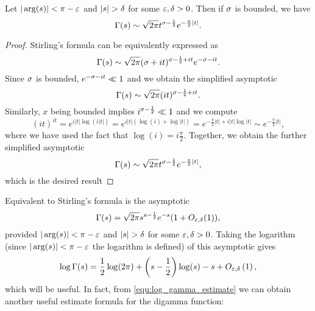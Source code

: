     \begin{corollary}\label{equ:weaker_Stirling_formula}
    Let $|\arg(s)| < \pi-\varepsilon$ and $|s| > \delta$ for some $\varepsilon,\delta > 0$. Then if $\sigma$ is bounded, we have
      \[
        \Gamma(s) \sim \sqrt{2\pi}t^{\sigma-\frac{1}{2}}e^{-\frac{\pi}{2}|t|}.
      \]
    \end{corollary}
    \begin{proof}
      Stirling's formula can be equivalently expressed as
      \[
        \Gamma(s) \sim \sqrt{2\pi}(\sigma+it)^{\sigma-\frac{1}{2}+it}e^{-\sigma-it}.
      \]
      Since $\sigma$ is bounded, $e^{-\sigma-it} \ll 1$ and we obtain the simplified asymptotic
      \[
        \Gamma(s) \sim \sqrt{2\pi}(it)^{\sigma-\frac{1}{2}+it}.
      \]
      Similarly, $x$ being bounded implies $i^{\sigma-\frac{1}{2}} \ll 1$ and we compute
      \[
        (it)^{it} = e^{i|t|\log(i|t|)} = e^{i|t|(\log(i)+\log|t|)} = e^{-\frac{\pi}{2}|t|+i|t|\log|t|} \sim e^{-\frac{\pi}{2}|t|},
      \]
      where we have used the fact that $\log(i) = i\frac{\pi}{2}$. Together, we obtain the further simplified asymptotic
      \[
        \Gamma(s) \sim \sqrt{2\pi}t^{\sigma-\frac{1}{2}}e^{-\frac{\pi}{2}|t|},
      \]
      which is the desired result
    \end{proof}
    Equivalent to Stirling's formula is the asymptotic
    \begin{equation}\label{equ:Stirlings_formula_equivalent_version}
        \Gamma(s) = \sqrt{2\pi}s^{s-\frac{1}{2}}e^{-s}(1+O_{\varepsilon,\delta}(1)),
    \end{equation}
    provided $|\arg(s)| < \pi-\varepsilon$ and $|s| > \delta$ for some $\varepsilon,\delta > 0$. Taking the logarithm (since $|\arg(s)| < \pi-\varepsilon$ the logarithm is defined) of this asymptotic gives
    \begin{equation}\label{equ:log_gamma_estimate}
      \log\Gamma(s) = \frac{1}{2}\log(2\pi)+\left(s-\frac{1}{2}\right)\log(s)-s+O_{\varepsilon,\delta}\left(1\right),
    \end{equation}
    which will be useful. In fact, from \cref{equ:log_gamma_estimate} we can obtain another useful estimate formula for the digamma function:

